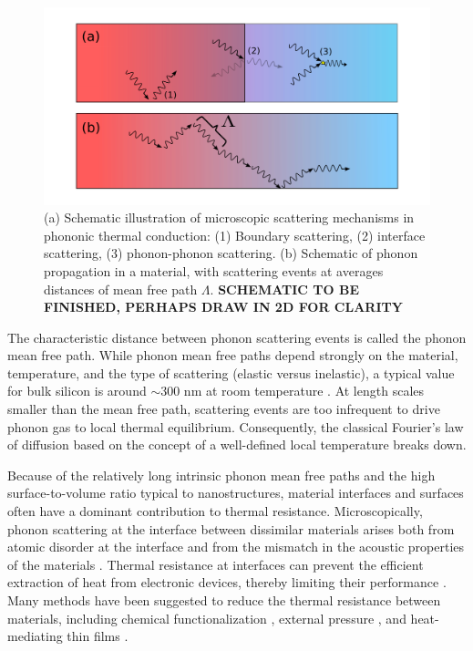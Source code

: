 \begin{figure}
\begin{center}
 \includegraphics[width=.99\columnwidth]{inkscape/scattering.pdf}
 \caption{(a) Schematic illustration of microscopic scattering mechanisms in phononic thermal conduction: (1) Boundary scattering, (2) interface scattering, (3) phonon-phonon scattering. (b) Schematic of phonon propagation in a material, with scattering events at averages distances of mean free path $\Lambda$. \textbf{SCHEMATIC TO BE FINISHED, PERHAPS DRAW IN 2D FOR CLARITY}}
\label{fig:intro_scattering}
\end{center}
\end{figure}

The characteristic distance between phonon scattering events is called the phonon mean free path. While phonon mean free paths depend strongly on the material, temperature, and the type of scattering (elastic versus inelastic), a typical value for bulk silicon is around $\sim 300$ nm at room temperature \cite{ju99}. At length scales smaller than the mean free path, scattering events are too infrequent to drive phonon gas to local thermal equilibrium. Consequently, the classical Fourier's law of diffusion \cite{fourier} based on the concept of a well-defined local temperature breaks down. 

Because of the relatively long intrinsic phonon mean free paths and the high surface-to-volume ratio typical to nanostructures, material interfaces and surfaces often have a dominant contribution to thermal resistance. Microscopically, phonon scattering at the interface between dissimilar materials arises both from atomic disorder at the interface and from the mismatch in the acoustic properties of the materials \cite{}. Thermal resistance at interfaces can prevent the efficient extraction of heat from electronic devices, thereby limiting their performance \cite{pop10}. Many methods have been suggested to reduce the thermal resistance between materials, including chemical functionalization \cite{hopkins11,kaur14}, external pressure \cite{shen11,chalopin12}, and heat-mediating thin films \cite{english12}. 

